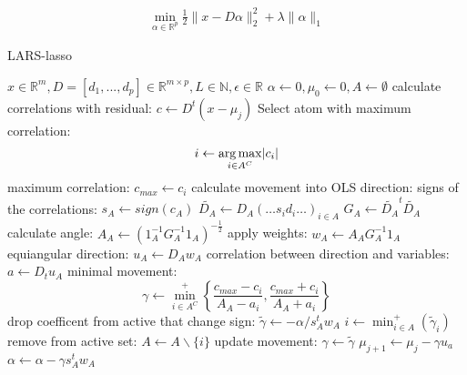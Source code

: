 \begin{align}
\min_{\alpha\in\mathbb{R}^{p}}  \frac{1}{2} \lVert x - D\alpha \rVert^{2}_{2} + \lambda \lVert \alpha \rVert_{1}
\end{align}

\begin{algorithm}
\caption{LARS-lasso}
\begin{algorithmic}[1]
\REQUIRE $x \in \mathbb{R}^m, D =[d_1,...,d_p] \in \mathbb{R}^{m\times p}, L \in \mathbb{N}, \epsilon \in \mathbb{R}$
\STATE $\alpha \gets 0, \mu_{0} \gets 0, A \gets \emptyset$
\STATE calculate correlations with residual: $c \gets D^t\left( x-\mu_j \right) $
\STATE Select atom with maximum correlation: 
\begin{equation*}
i \gets \argmax_{i \in A^C} \lvert c_i  \rvert %
\end{equation*}
\STATE maximum correlation: $c_{max} \gets c_i $ %
\STATE calculate movement into OLS direction:
\STATE signs of the correlations: $s_A \gets  sign\left(c_A\right)$
\STATE $\tilde{D_A} \gets D_A\left(\ldots s_id_i \ldots\right)_{i\in A}$
\STATE $G_A \gets \tilde{D_A}^t\tilde{D_A}$
\STATE calculate angle: $A_A \gets \left( 1_A^{-1} G_A^{-1} 1_A \right)^{-\frac{1}{2}}$
\STATE apply weights: $w_A \gets A_AG_A^{-1}1_A$
\STATE equiangular direction: $u_A \gets D_Aw_A$
\STATE correlation between direction and variables: $a \gets D_tu_A$
\STATE minimal movement:
\begin{equation*}
\gamma \gets \min_{i\in A^C}^{+} \left\lbrace \frac{c_{max}-c_i }{A_A-a_i }, \frac{c_{max}+c_i }{A_A+a_i } \right\rbrace
\end{equation*}
\STATE drop coefficent from active that change sign: 
\STATE $ \tilde{\gamma} \gets -\alpha/s_A^tw_A  $
\STATE $ i \gets \min_{i\in A}^{+} \left( \tilde{\gamma}_i \right) $
\STATE remove from active set: $ A \gets A \backslash \{i\} $
\STATE update movement: $ \gamma \gets \tilde{\gamma} $  
\ENDIF
\STATE $ \mu_{j+1} \gets \mu_{j} - \gamma u_a $
\STATE $ \alpha \gets \alpha - \gamma s_A^tw_A $

\ENDFOR

\end{algorithmic}
\end{algorithm}

